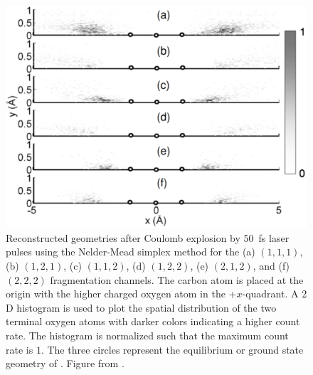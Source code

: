 \begin{figure}
  \centering
  \includegraphics[width=\textwidth]{gfx/SimplexJPhysB}
  \caption[Reconstructed  geometries using the Nelder-Mead simplex method.]
  {Reconstructed  geometries after Coulomb explosion by \SI{50}{\fs} laser pulses using the Nelder-Mead simplex method for the (a) $(1,1,1)$, (b) $(1,2,1)$, (c) $(1,1,2)$, (d) $(1,2,2)$, (e) $(2,1,2)$, and (f) $(2,2,2)$ fragmentation channels. The carbon atom is placed at the origin with the higher charged oxygen atom in the +$x$-quadrant. A $2$D histogram is used to plot the spatial distribution of the two terminal oxygen atoms with darker colors indicating a higher count rate. The histogram is normalized such that the maximum count rate is $1$. The three circles represent the equilibrium or ground state geometry of . Figure from \citet{Brichta07}.}
  \label{fig:simplexJPhysB}
\end{figure}

